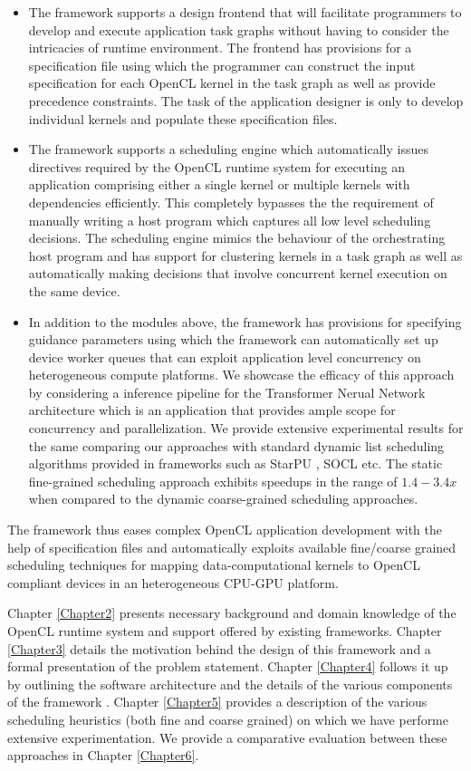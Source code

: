 \begin{itemize}
    \item The framework supports a design frontend that will facilitate programmers to develop and execute application task graphs without having to consider the intricacies of runtime environment. The frontend has provisions for a specification file using which the programmer can construct the input specification for each OpenCL kernel in the task graph as well as provide  precedence constraints.  The task of the application designer is only to develop individual kernels and populate these specification files.
    \item The framework supports a scheduling engine which automatically issues directives required by the OpenCL runtime system for executing an application comprising either a single kernel or multiple kernels with dependencies efficiently. This completely bypasses the the requirement of manually writing a host program which captures all low level scheduling decisions. The scheduling engine  mimics the behaviour of the orchestrating host program and has support for clustering kernels in a task graph as well as automatically making decisions that involve concurrent kernel execution on the same device.
    \item In addition to the modules above, the framework has provisions for specifying guidance parameters using which the framework can automatically set up device worker queues that can exploit application level concurrency on heterogeneous compute platforms. We showcase the efficacy of this approach by considering a inference pipeline for the Transformer Nerual Network architecture \cite{DBLP:journals/corr/VaswaniSPUJGKP17} which is an application that provides ample scope for concurrency and parallelization. We provide extensive experimental results for the same comparing our approaches with standard dynamic list scheduling algorithms provided in frameworks such as StarPU \cite{augonnet2011starpu}, SOCL \cite{henry2014toward} etc. The static fine-grained scheduling approach exhibits  speedups in the range of $1.4-3.4x$ when compared to the dynamic coarse-grained scheduling approaches.     
\end{itemize}

The framework thus eases complex OpenCL application development with the help of specification files and automatically exploits available fine/coarse grained scheduling techniques for mapping data-computational kernels to OpenCL compliant devices in an heterogeneous CPU-GPU platform. 
\par Chapter \ref{Chapter2} presents necessary background and domain knowledge of the OpenCL runtime system and support offered by existing frameworks. Chapter \ref{Chapter3} details the motivation behind the design of this framework and a formal presentation of the problem statement. Chapter \ref{Chapter4} follows it up by outlining the software architecture  and the details of the various components of the framework . Chapter \ref{Chapter5} provides a description of the various scheduling heuristics (both fine and coarse grained) on which we have performe extensive experimentation. We provide a comparative evaluation between these approaches in Chapter \ref{Chapter6}. 
   

